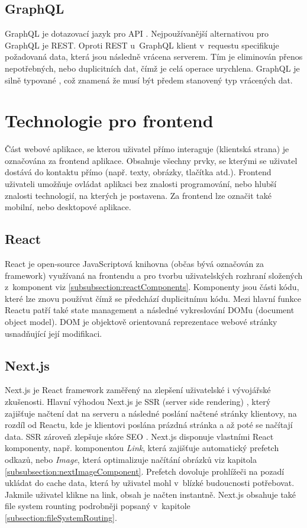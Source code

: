 \documentclass[12pt, a4paper,
  oneside,      %
]{report}
\begin{document}
\subsection{GraphQL}
GraphQL je dotazovací jazyk pro API \cite{graphqlIntroduction}. Nejpoužívanější alternativou pro GraphQL je REST. Oproti REST u~GraphQL klient v~requestu specifikuje požadovaná data, která jsou následně vrácena serverem. Tím je eliminován přenos nepotřebných, nebo duplicitních dat, čímž je celá operace urychlena. GraphQL je silně typované \cite{graphqlTypes}, což znamená že musí být předem stanovený typ vrácených dat. \cite{restApiRedHat}\cite{whatIsApiAws}


\section{Technologie pro frontend}
Část webové aplikace, se kterou uživatel přímo interaguje (klientská strana) je označována za frontend aplikace. Obsahuje všechny prvky, se kterými se uživatel dostává do kontaktu přímo (např. texty, obrázky, tlačítka atd.). Frontend uživateli umožňuje ovládat aplikaci bez znalosti programování, nebo hlubší znalosti technologií, na kterých je postavena. Za frontend lze označit také mobilní, nebo desktopové aplikace. \cite{whatIsFrontend}

\clearpage
\subsection{React}
React je open-source JavaScriptová knihovna (občas bývá označován za framework) využívaná na frontendu a pro tvorbu uživatelských rozhraní složených z~komponent viz \ref{subsubsection:reactComponents}. Komponenty jsou části kódu, které lze znovu používat čímž se předchází duplicitnímu kódu. Mezi hlavní funkce Reactu patří také state management a následné vykreslování DOMu (document object model). DOM je objektově orientovaná reprezentace webové stránky usnadňující její modifikaci. \cite{reactComponentsAndProps}\cite{gettingStartedReact}
\subsection{Next.js}
Next.js je React framework zaměřený na zlepšení uživatelské i vývojářské zkušenosti. Hlavní výhodou Next.js je SSR (server side rendering) \cite{whatIsSSR}, který zajišťuje načtení dat na serveru a následné poslání načtené stránky klientovy, na rozdíl od Reactu, kde je klientovi poslána prázdná stránka a až poté se načítají data. SSR zároveň zlepšuje skóre SEO \cite{whatIsSEO}. Next.js disponuje vlastními React komponenty, např. komponentou \textit{Link}, která zajišťuje automatický prefetch odkazů, nebo \textit{Image}, která optimalizuje načítání obrázků viz kapitola \ref{subsubsection:nextImageComponent}. Prefetch dovoluje prohlížeči na pozadí ukládat do cache data, která by uživatel mohl v~blízké budoucnosti potřebovat. Jakmile uživatel klikne na link, obsah je načten instantně. Next.js obsahuje také file system rounting podrobněji popsaný v~kapitole \ref{subsection:fileSystemRouting}. \cite{nextGetStarted}
\end{document}

